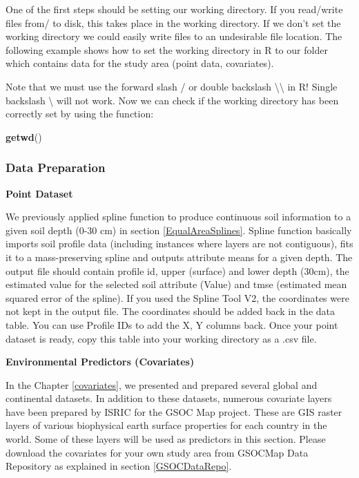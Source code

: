 \documentclass[10pt,b5paper,]{book}
\newenvironment{Shaded}{\begin{snugshade}}{\end{snugshade}}
\newcommand{\KeywordTok}[1]{\textcolor[rgb]{0.13,0.29,0.53}{\textbf{#1}}}
\newcommand{\NormalTok}[1]{#1}
\theoremstyle{definition}
\theoremstyle{definition}
\theoremstyle{definition}
\theoremstyle{remark}
\begin{document}
One of the first steps should be setting our working directory. If you
read/write files from/ to disk, this takes place in the working
directory. If we don't set the working directory we could easily write
files to an undesirable file location. The following example shows how
to set the working directory in R to our folder which contains data for
the study area (point data, covariates).

Note that we must use the forward slash / or double backslash
\textbackslash{}\textbackslash{} in R! Single backslash \textbackslash{}
will not work. Now we can check if the working directory has been
correctly set by using the function:

\begin{Shaded}
\begin{Highlighting}[]
\KeywordTok{getwd}\NormalTok{()}
\end{Highlighting}
\end{Shaded}

\hypertarget{data-preparation-1}{%
\subsubsection{Data Preparation}\label{data-preparation-1}}

\textbf{Point Dataset}

We previously applied spline function to produce continuous soil
information to a given soil depth (0-30 cm) in section
\ref{EqualAreaSplines}. Spline function basically imports soil profile
data (including instances where layers are not contiguous), fits it to a
mass-preserving spline and outputs attribute means for a given depth.
The output file should contain profile id, upper (surface) and lower
depth (30cm), the estimated value for the selected soil attribute
(Value) and tmse (estimated mean squared error of the spline). If you
used the Spline Tool V2, the coordinates were not kept in the output
file. The coordinates should be added back in the data table. You can
use Profile IDs to add the X, Y columns back. Once your point dataset is
ready, copy this table into your working directory as a .csv file.

\textbf{Environmental Predictors (Covariates)}

In the Chapter \ref{covariates}, we presented and prepared several
global and continental datasets. In addition to these datasets, numerous
covariate layers have been prepared by ISRIC for the GSOC Map project.
These are GIS raster layers of various biophysical earth surface
properties for each country in the world. Some of these layers will be
used as predictors in this section. Please download the covariates for
your own study area from GSOCMap Data Repository as explained in section
\ref{GSOCDataRepo}.
\end{document}

